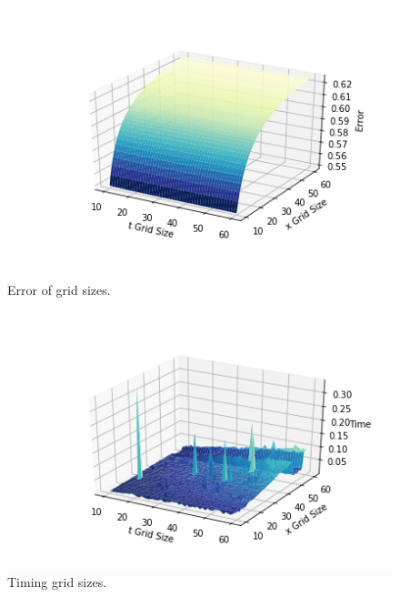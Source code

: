 \documentclass[12pt, oneside]{book}
\theoremstyle{plain}
\theoremstyle{definition}
\begin{document}
 
\begin{figure}[!htb]
  \begin{minipage}[b]{0.5\textwidth}
    \includegraphics[width=\textwidth]{HeatExplicitGridError.png}
    \caption{Error of grid sizes.}
  \end{minipage}
  \begin{minipage}[b]{0.5\textwidth}
    \includegraphics[width=\textwidth]{HeatExplicitGridTimer.png}
    \caption{Timing grid sizes.}
  \end{minipage}
\end{figure}
\end{document}
